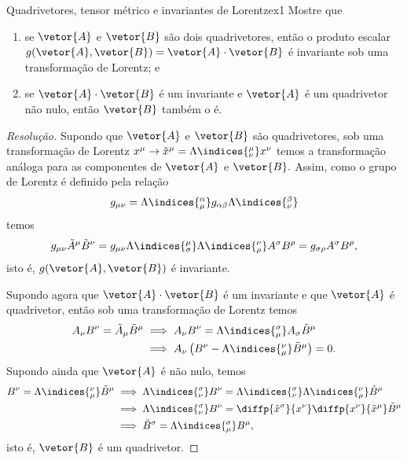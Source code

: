 \begin{exercício}{Quadrivetores, tensor métrico e invariantes de Lorentz}{ex1}
   Mostre que
   \begin{enumerate}[label=(\alph*)]
      \item se \(\vetor{A}\) e \(\vetor{B}\) são dois quadrivetores, então o produto escalar \(g(\vetor{A}, \vetor{B}) = \vetor{A} \cdot \vetor{B}\) é invariante sob uma transformação de Lorentz; e
      \item se \(\vetor{A} \cdot \vetor{B}\) é um invariante e \(\vetor{A}\) é um quadrivetor não nulo, então \(\vetor{B}\) também o é.
   \end{enumerate}
\end{exercício}
\begin{proof}[Resolução]
   Supondo que \(\vetor{A}\) e \(\vetor{B}\) são quadrivetores, sob uma transformação de Lorentz \(x^\mu \to \tilde{x}^\mu = \Lambda\indices{^\mu_\nu} x^\nu\) temos a transformação análoga para as componentes de \(\vetor{A}\) e \(\vetor{B}.\) Assim, como o grupo de Lorentz é definido pela relação
   \begin{equation*}
      g_{\mu\nu} = \Lambda\indices{^\alpha_\mu} g_{\alpha \beta} \Lambda\indices{^\beta_\nu}
   \end{equation*}
   temos
   \begin{equation*}
      g_{\mu\nu} \tilde{A}^\mu \tilde{B}^\nu = g_{\mu\nu} \Lambda\indices{^\mu_\sigma} \Lambda\indices{^\nu_\rho} A^\sigma B^\rho = g_{\sigma \rho} A^{\sigma} B^\rho,
   \end{equation*}
   isto é, \(g(\vetor{A}, \vetor{B})\) é invariante.

   Supondo agora que \(\vetor{A}\cdot \vetor{B}\) é um invariante e que \(\vetor{A}\) é quadrivetor, então sob uma transformação de Lorentz temos
   \begin{align*}
      A_\nu B^\nu = \tilde{A}_\mu \tilde{B}^\mu
      &\implies A_\nu B^\nu = \Lambda\indices{_\mu^\sigma} A_\sigma \tilde{B}^\mu\\
      &\implies A_\nu\left(B^\nu - \Lambda\indices{_\mu^\nu} \tilde{B}^\mu\right) = 0.
   \end{align*}
   Supondo ainda que \(\vetor{A}\) é não nulo, temos
   \begin{align*}
      B^\nu = \Lambda\indices{_\mu^\nu} \tilde{B}^\mu 
      &\implies \Lambda\indices{^\sigma_\nu} B^\nu = \Lambda\indices{^\sigma_\nu} \Lambda\indices{_\mu^\nu} \tilde{B}^\mu\\
      &\implies \Lambda\indices{^\sigma_\nu} B^\nu = \diffp{\tilde{x}^\sigma}{x^\nu} \diffp{x^\nu}{\tilde{x}^\mu} \tilde{B}^\mu\\
      &\implies \tilde{B}^\sigma = \Lambda\indices{^\sigma_\mu} B^\mu,
   \end{align*}
   isto é, \(\vetor{B}\) é um quadrivetor.
\end{proof}

